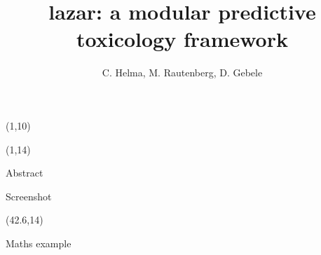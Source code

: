 \documentclass[final]{beamer}
\title{lazar: a modular predictive toxicology framework}
\author{C. Helma, M. Rautenberg, D. Gebele}
\institute{\emph{in silico} toxicology gmbh, Basel, Switzerland}
\begin{document}
    
\begin{frame}{}

\begin{textblock}{80}(1,10)

\end{textblock}

 \begin{textblock}{40.5}(1,14)
\begin{block}{Abstract}

\end{block}

\begin{block}{Screenshot}

\end{block}
\end{textblock}

\begin{textblock}{40.5}(42.6,14)
\begin{block}{Maths example}

\end{block}

\end{textblock}

\end{frame}
\end{document}
